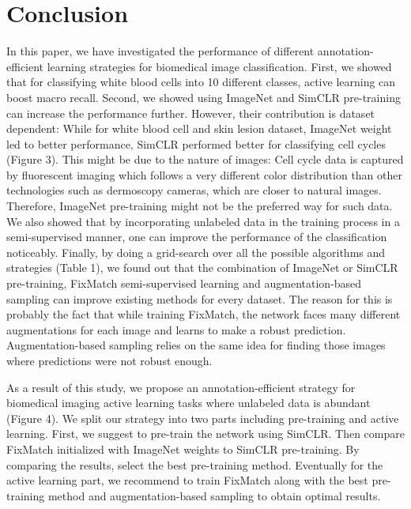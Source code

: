 
\chapter{Conclusion}\label{chapter:conclusion}

In this paper, we have investigated the performance of different annotation-efficient learning strategies for biomedical image classification. First, we showed that for classifying white blood cells into 10 different classes, active learning can boost macro recall. Second, we showed using ImageNet and SimCLR pre-training can increase the performance further. However, their contribution is dataset dependent: While for white blood cell and skin lesion dataset, ImageNet weight led to better performance, SimCLR performed better for classifying cell cycles (Figure 3). This might be due to the nature of images: Cell cycle data is captured by fluorescent imaging which follows a very different color distribution than other technologies such as dermoscopy cameras, which are closer to natural images. Therefore, ImageNet pre-training might not be the preferred way for such data.
We also showed that by incorporating unlabeled data in the training process in a semi-supervised manner, one can improve the performance of the classification noticeably. Finally, by doing a grid-search over all the possible algorithms and strategies (Table 1), we found out that the combination of ImageNet or SimCLR pre-training, FixMatch semi-supervised learning and augmentation-based sampling can improve existing methods for every dataset. The reason for this is probably the fact that while training FixMatch, the network faces many different augmentations for each image and learns to make a robust prediction. Augmentation-based sampling relies on the same idea for finding those images where predictions were not robust enough. 

As a result of this study, we propose an annotation-efficient strategy for biomedical imaging active learning tasks where unlabeled data is abundant (Figure 4). We split our strategy into two parts including pre-training and active learning. First, we suggest to pre-train the network using SimCLR. Then compare FixMatch initialized with ImageNet weights to SimCLR pre-training. By comparing the results, select the best pre-training method. Eventually for the active learning part, we recommend to train FixMatch along with the best pre-training method and augmentation-based sampling to obtain optimal results.


